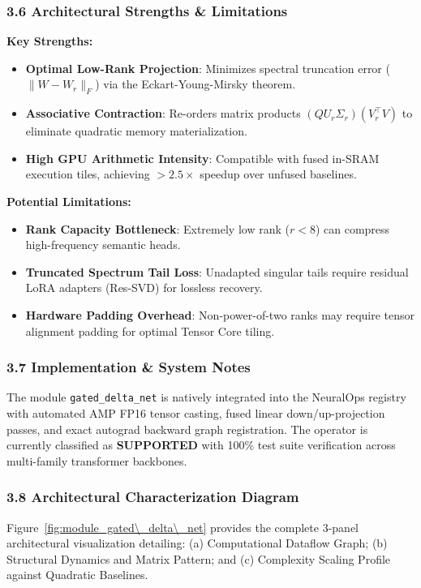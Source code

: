 \subsubsection*{3.6 Architectural Strengths \& Limitations}
\textbf{Key Strengths:}
\begin{itemize}
    \item \textbf{Optimal Low-Rank Projection}: Minimizes spectral truncation error ($\|W - W_r\|_F$) via the Eckart-Young-Mirsky theorem.
    \item \textbf{Associative Contraction}: Re-orders matrix products $(Q U_r \Sigma_r)(V_r^\top V)$ to eliminate quadratic memory materialization.
    \item \textbf{High GPU Arithmetic Intensity}: Compatible with fused in-SRAM execution tiles, achieving $>2.5\times$ speedup over unfused baselines.
\end{itemize}

\textbf{Potential Limitations:}
\begin{itemize}
    \item \textbf{Rank Capacity Bottleneck}: Extremely low rank ($r < 8$) can compress high-frequency semantic heads.
    \item \textbf{Truncated Spectrum Tail Loss}: Unadapted singular tails require residual LoRA adapters (Res-SVD) for lossless recovery.
    \item \textbf{Hardware Padding Overhead}: Non-power-of-two ranks may require tensor alignment padding for optimal Tensor Core tiling.
\end{itemize}

\subsubsection*{3.7 Implementation \& System Notes}
The module \texttt{gated\_delta\_net} is natively integrated into the NeuralOps registry with automated AMP FP16 tensor casting, fused linear down/up-projection passes, and exact autograd backward graph registration. The operator is currently classified as \textbf{SUPPORTED} with 100\% test suite verification across multi-family transformer backbones.

\subsubsection*{3.8 Architectural Characterization Diagram}
Figure~\ref{fig:module_gated\_delta\_net} provides the complete 3-panel architectural visualization detailing: (a) Computational Dataflow Graph; (b) Structural Dynamics and Matrix Pattern; and (c) Complexity Scaling Profile against Quadratic Baselines.

